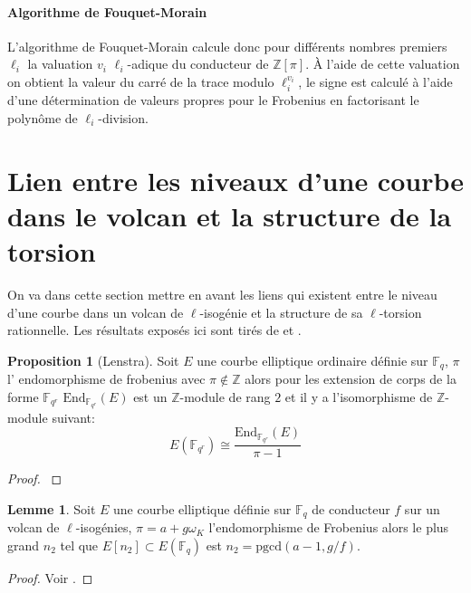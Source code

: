 \documentclass[10pt,a4paper]{book}
\theoremstyle{plain}
\theoremstyle{definition}
\newtheorem{lem}[thm]{Lemme}
\theoremstyle{definition}
\theoremstyle{definition}
\newtheorem{prop}[thm]{Proposition}
\theoremstyle{definition}
\theoremstyle{remark}
\theoremstyle{remark}
\theoremstyle{definition}
\begin{document}
\paragraph{Algorithme de Fouquet-Morain}
L'algorithme de Fouquet-Morain \cite{FouquetMorain02} calcule donc pour différents nombres premiers $\ell_i$ la valuation $v_i$ $\ell_i$-adique du conducteur de $\mathbb{Z}[\pi]$. \`A l'aide de cette valuation on obtient la valeur du carré de la trace modulo $\ell_i^{v_i}$, le signe est calculé à l'aide d'une détermination de valeurs propres pour le Frobenius en factorisant le polynôme de $\ell_i$-division. 



\section{Lien entre les niveaux d'une courbe dans le volcan et la structure de la torsion}
\label{sec:lie:niv}
On va dans cette section mettre en avant les liens qui existent entre le niveau d'une courbe dans un volcan de $\ell$-isogénie et la structure de sa $\ell$-torsion rationnelle. Les résultats exposés ici sont tirés de \cite{MiretMSTV08} et \cite{Ionica-Joux10}.

\begin{prop}[Lenstra]
\label{pro:len:str}
Soit $E$ une courbe elliptique ordinaire définie sur $\mathbb{F}_q$, $\pi$ l' endomorphisme de frobenius avec $\pi \not \in \mathbb{Z}$ alors pour les extension de corps de la forme $\mathbb{F}_{q^r}$ $\mathrm{End}_{\mathbb{F}_{q^r}}(E)$ est un $\mathbb{Z}$-module de rang $2$ et il y a l'isomorphisme de $\mathbb{Z}$-module suivant:
\[
E(\mathbb{F}_{q^r}) \cong \frac{\mathrm{End}_{\mathbb{F}_{q^r}}(E)}{\pi-1}
\] 
\end{prop}

\begin{proof}
\cite[Theorem 1]{Lenstra1996}
\end{proof}

\begin{lem}
\label{lem:ruc:rat}
Soit $E$ une courbe elliptique définie sur $\mathbb{F}_q$ de conducteur $f$ sur un volcan de $\ell$-isogénies, $\pi=a+g \omega_K$ l'endomorphisme de Frobenius alors le plus grand $n_2$ tel que $E[n_2] \subset E(\mathbb{F}_q)$ est $n_2=\mathrm{pgcd}(a-1,g/f)$.
\end{lem}

\begin{proof}
Voir  \cite[Lemma 1]{Ruck1987}.
\end{proof}
\end{document}
